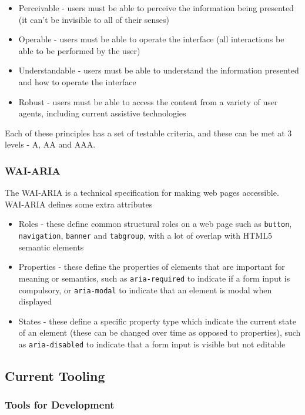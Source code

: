 \documentclass[ %
                    author={Aleena Baig},
                supervisor={Dr Simon Lock},
                    degree={BSc},
                     title={On Making Web Accessible Graphs},
                  subtitle={},
                      year={2019} ]{dissertation}
\begin{document}
\begin{itemize}
    \item Perceivable - users must be able to perceive the information being presented (it can't be invisible to all of their senses)
    \item Operable - users must be able to operate the interface (all interactions be able to be performed by the user)
    \item Understandable - users must be able to understand the information presented and how to operate the interface
    \item Robust - users must be able to access the content from a variety of user agents, including current assistive technologies
\end{itemize}
%
Each of these principles has a set of testable criteria, and these can be met at 3 levels - A, AA and AAA.

\subsubsection{WAI-ARIA}

The WAI-ARIA \cite{WAIARIA} is a technical specification for making web pages accessible. WAI-ARIA defines some extra attributes \cite{WAIARIAspec}

\begin{itemize}
    \item Roles - these define common structural roles on a web page such as \texttt{button}, \texttt{navigation}, \texttt{banner} and \texttt{tabgroup}, with a lot of overlap with HTML5 semantic elements
    \item Properties - these define the properties of elements that are important for meaning or semantics, such as \texttt{aria-required} to indicate if a form input is compulsory, or \texttt{aria-modal} to indicate that an element is modal when displayed
    \item States - these define a specific property type which indicate the current state of an element (these can be changed over time as opposed to properties), such as \texttt{aria-disabled} to indicate that a form input is visible but not editable
\end{itemize}

\subsection{Current Tooling}

\subsubsection{Tools for Development}
\end{document}
